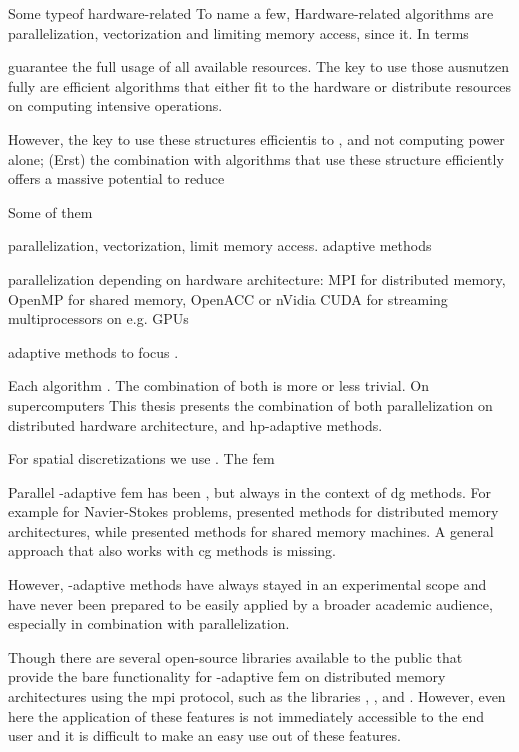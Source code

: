 Some typeof hardware-related 
To name a few, Hardware-related algorithms are parallelization, vectorization and limiting memory access, since it. In terms 


guarantee the full usage of all available resources. The key to use those ausnutzen fully are efficient algorithms that either fit to the hardware or distribute resources on computing intensive operations.

However, the key to use these structures efficientis to , and not computing power alone; (Erst) the combination with algorithms that use these structure efficiently offers a massive potential to reduce 




Some of them

parallelization, vectorization, limit memory access. adaptive methods

parallelization depending on hardware architecture: MPI for distributed memory, OpenMP for shared memory, OpenACC or nVidia CUDA for streaming multiprocessors on e.g. GPUs

adaptive methods to focus .


Each algorithm . The combination of both is more or less trivial.
On supercomputers
This thesis presents the combination of both parallelization on distributed hardware architecture, and hp-adaptive methods.

For spatial discretizations we use . The \gls{fem}


Parallel \hp-adaptive \gls{fem} has been , but always in the context of \gls{dg} methods. For example for Navier-Stokes problems, \textcites{paszynski2006}{chalmers2019} presented methods for distributed memory architectures, while \textcites{paszynski2011}{jomo2017} presented methods for shared memory machines. A general approach that also works with \gls{cg} methods is missing.


However, \hp-adaptive methods have always stayed in an experimental scope and have never been prepared to be easily applied by a broader academic audience, especially in combination with parallelization.

Though there are several open-source libraries available to the public that provide the bare functionality for \hp-adaptive \gls{fem} on distributed memory architectures using the \gls{mpi} protocol, such as the libraries \phaml{} \parencites{mitchell2002}{phaml1200}, \phg{} \parencites{zhanglin-bo2019}{phg094}, and \mofem{} \parencites{kaczmarczyk2020}{mofem090}. However, even here the application of these features is not immediately accessible to the end user and it is difficult to make an easy use out of these features.

